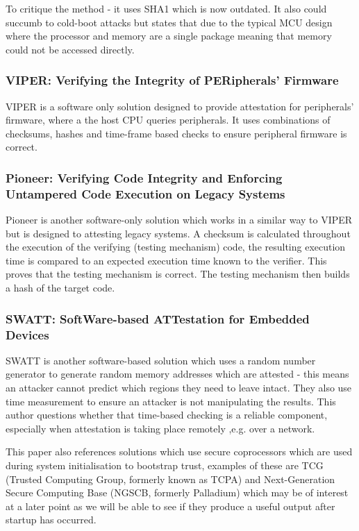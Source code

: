 To critique the method - it uses SHA1 which is now outdated. It also could succumb to cold-boot attacks but states that due to the typical MCU design where the processor and memory are a single package meaning that memory could not be accessed directly.

\subsubsection{VIPER: Verifying the Integrity of PERipherals’ Firmware}

VIPER \cite{Li2011} is a software only solution designed to provide attestation for peripherals’ firmware, where a the host CPU queries peripherals. It uses combinations of checksums, hashes and time-frame based checks to ensure peripheral firmware is correct.

\subsubsection{Pioneer: Verifying Code Integrity and Enforcing Untampered Code Execution on Legacy Systems}

Pioneer \cite{Seshadri2007} is another software-only solution which works in a similar way to VIPER but is designed to attesting legacy systems. A checksum is calculated throughout the execution of the verifying (testing mechanism) code, the resulting execution time is compared to an expected execution time known to the verifier. This proves that the testing mechanism is correct. The testing mechanism then builds a hash of the target code.

\subsubsection{SWATT: SoftWare-based ATTestation for Embedded Devices}

SWATT \cite{Seshadri2004} is another software-based solution which uses a random number generator to generate random memory addresses which are attested - this means an attacker cannot predict which regions they need to leave intact. They also use time measurement to ensure an attacker is not manipulating the results. This author questions whether that time-based checking is a reliable component, especially when attestation is taking place remotely ,e.g. over a network.

 This paper also references solutions which use secure coprocessors which are used during system initialisation to bootstrap trust, examples of these are TCG (Trusted Computing Group, formerly known as TCPA) and Next-Generation Secure Computing Base (NGSCB, formerly Palladium) which may be of interest at a later point as we will be able to see if they produce a useful output after startup has occurred.

